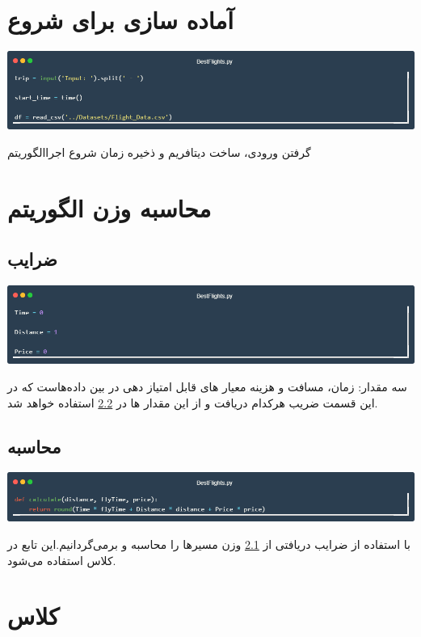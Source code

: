 \documentclass[12pt, dvipsnames, svgnames, x11names,]{article}
\begin{document}
			
	\section{آماده سازی برای شروع}

		{\includegraphics[width=14cm]{images/code01}} \par
		{\normalsize گرفتن ورودی، ‌ساخت دیتافریم و ذخیره زمان شروع اجراالگوریتم}
			
			
	\section{محاسبه وزن الگوریتم}
		
		\subsection{ضرایب} \label{weitghs}
				
			\includegraphics[width=14cm]{images/code02} \par
			{\normalsize سه مقدار: زمان،‌ مسافت و هزینه معیار های قابل امتیاز دهی در بین  داده‌هاست که در این قسمت ضریب هرکدام دریافت و از این مقدار ها در \ref{calculate_func} استفاده خواهد شد.}
				
		\subsection{محاسبه} \label{calculate_func}
				
			\includegraphics[width=14cm]{images/code03} \par
			{\normalsize با استفاده از ضرایب دریافتی از \ref{weitghs} وزن مسیرها را محاسبه و برمی‌گردانیم.این تابع در کلاس  استفاده می‌شود.}
		
	
	\section{کلاس } \label{node_class}
	
\end{document}
